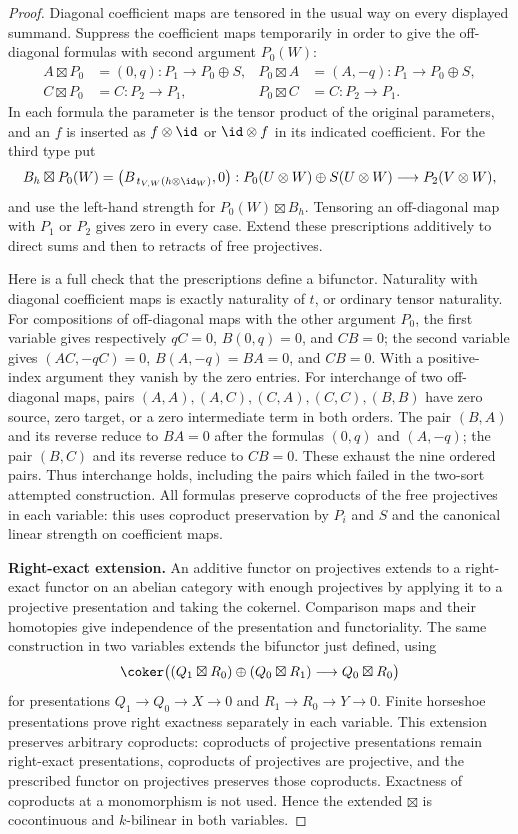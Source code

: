 \begin{proof}
Diagonal coefficient maps are tensored in the usual way on every displayed summand. Suppress the coefficient maps temporarily in order to give the off-diagonal formulas with second argument $P_0(W)$:
\begin{align*}
A\boxtimes P_0&=(0,q):P_1\longrightarrow P_0\oplus S,&
P_0\boxtimes A&=(A,-q):P_1\longrightarrow P_0\oplus S,\\
C\boxtimes P_0&=C:P_2\longrightarrow P_1,&
P_0\boxtimes C&=C:P_2\longrightarrow P_1.
\end{align*}
In each formula the parameter is the tensor product of the original parameters, and an $f$ is inserted as $f\otimes\id$ or $\id\otimes f$ in its indicated coefficient. For the third type put
\[
B_h\boxtimes P_0(W)=
\bigl(B_{\,t_{V,W}(h\otimes\id_W)},0\bigr):
P_0(U\otimes W)\oplus S(U\otimes W)\longrightarrow P_2(V\otimes W),
\]
and use the left-hand strength for $P_0(W)\boxtimes B_h$. Tensoring an off-diagonal map with $P_1$ or $P_2$ gives zero in every case. Extend these prescriptions additively to direct sums and then to retracts of free projectives.

Here is a full check that the prescriptions define a bifunctor. Naturality with diagonal coefficient maps is exactly naturality of $t$, or ordinary tensor naturality. For compositions of off-diagonal maps with the other argument $P_0$, the first variable gives respectively $qC=0$, $B(0,q)=0$, and $CB=0$; the second variable gives $(AC,-qC)=0$, $B(A,-q)=BA=0$, and $CB=0$. With a positive-index argument they vanish by the zero entries. For interchange of two off-diagonal maps, pairs $(A,A),(A,C),(C,A),(C,C),(B,B)$ have zero source, zero target, or a zero intermediate term in both orders. The pair $(B,A)$ and its reverse reduce to $BA=0$ after the formulas $(0,q)$ and $(A,-q)$; the pair $(B,C)$ and its reverse reduce to $CB=0$. These exhaust the nine ordered pairs. Thus interchange holds, including the pairs which failed in the two-sort attempted construction. All formulas preserve coproducts of the free projectives in each variable: this uses coproduct preservation by $P_i$ and $S$ and the canonical linear strength on coefficient maps.

\textbf{Right-exact extension.}
An additive functor on projectives extends to a right-exact functor on an abelian category with enough projectives by applying it to a projective presentation and taking the cokernel. Comparison maps and their homotopies give independence of the presentation and functoriality. The same construction in two variables extends the bifunctor just defined, using
\[
\coker\bigl((Q_1\boxtimes R_0)\oplus(Q_0\boxtimes R_1)
\longrightarrow Q_0\boxtimes R_0\bigr)
\]
for presentations $Q_1\to Q_0\to X\to0$ and $R_1\to R_0\to Y\to0$. Finite horseshoe presentations prove right exactness separately in each variable. This extension preserves arbitrary coproducts: coproducts of projective presentations remain right-exact presentations, coproducts of projectives are projective, and the prescribed functor on projectives preserves those coproducts. Exactness of coproducts at a monomorphism is not used. Hence the extended $\boxtimes$ is cocontinuous and $k$-bilinear in both variables.


\end{proof}
